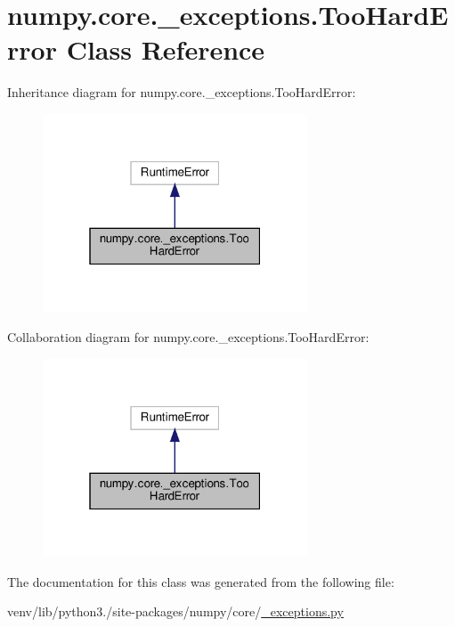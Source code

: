 \hypertarget{classnumpy_1_1core_1_1__exceptions_1_1TooHardError}{}\section{numpy.\+core.\+\_\+exceptions.\+Too\+Hard\+Error Class Reference}
\label{classnumpy_1_1core_1_1__exceptions_1_1TooHardError}


Inheritance diagram for numpy.\+core.\+\_\+exceptions.\+Too\+Hard\+Error\+:
\nopagebreak
\begin{figure}[H]
\begin{center}
\leavevmode
\includegraphics[width=223pt]{classnumpy_1_1core_1_1__exceptions_1_1TooHardError__inherit__graph}
\end{center}
\end{figure}


Collaboration diagram for numpy.\+core.\+\_\+exceptions.\+Too\+Hard\+Error\+:
\nopagebreak
\begin{figure}[H]
\begin{center}
\leavevmode
\includegraphics[width=223pt]{classnumpy_1_1core_1_1__exceptions_1_1TooHardError__coll__graph}
\end{center}
\end{figure}


The documentation for this class was generated from the following file\+:\begin{DoxyCompactItemize}
\item 
venv/lib/python3./site-\/packages/numpy/core/\hyperlink{__exceptions_8py}{\+\_\+exceptions.\+py}\end{DoxyCompactItemize}
